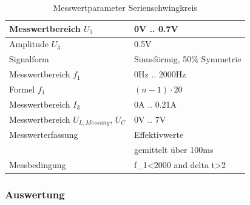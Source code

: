 \documentclass[12pt,a4paper]{article}
\begin{document}
\begin{table}[H]
	\centering
	\begin{tabular}{|l|l|}
		\hline
		Messwertbereich $U_3$&0V .. 0.7V\\
		\hline
		Amplitude $U_3$&0.5V\\
		\hline
		Signalform&Sinusförmig, 50\% Symmetrie\\
		\hline
		Messwertbereich $f_1$&0Hz .. 2000Hz\\
		\hline
		Formel $f_1$&$(n-1)\cdot20$\\
		\hline
		Messwertbereich $I_3$&0A .. 0.21A\\
		\hline
		Messwertbereich $U_{L,Messung}$, $U_C$&0V .. 7V\\
		\hline
		Messwerterfassung&Effektivwerte\\
		&gemittelt über 100ms\\
		\hline
		Messbedingung&f\_1<2000 and delta t>2\\
		\hline
	\end{tabular}
	\caption{Messwertparameter Serienschwingkreis}
	\label{table:Messwerterfassung_S}
\end{table}

\subsubsection{Auswertung}
\end{document}
